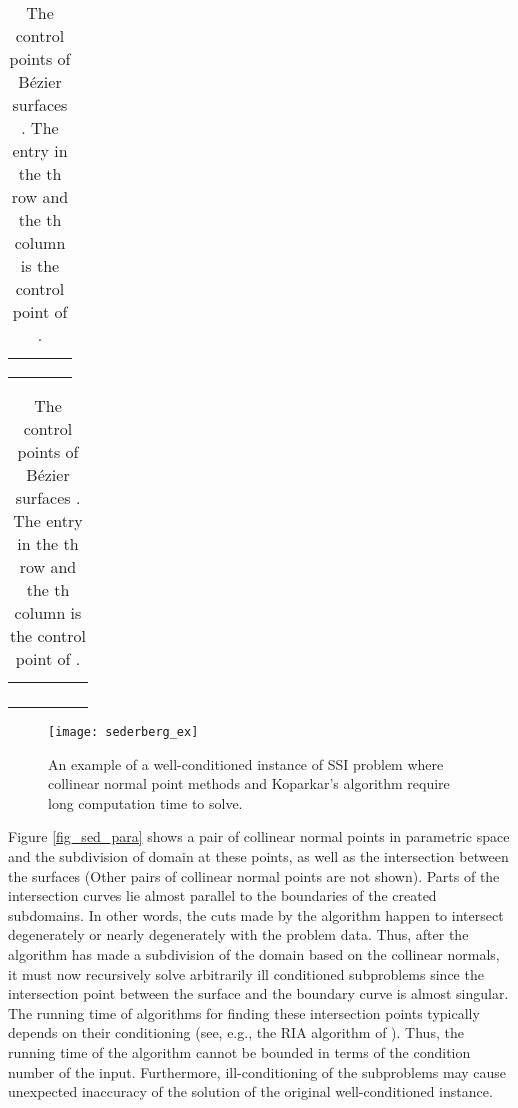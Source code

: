 \documentclass{article}
\begin{document}
\begin{table}
\begin{center}
{\scriptsize{
\begin{tabular}{|c|c|c|c|}
\hline 
 &  &&\\
\hline
&& &  \\
& && \\
& &&    \\
\hline
\end{tabular}
}}\end{center}
\caption{The control points of B\'{e}zier surfaces .  The entry in the th row and the th column is the control point  of .\label{table_sed1}}
\end{table}
\begin{table}
\begin{center}
{\scriptsize{
\begin{tabular}{|c|c|c|c|c|}
\hline 
 &  &&&\\
\hline
&&&&\\
&&&&\\
&&&&\\
&&&&\\
\hline
\end{tabular}
}}
\end{center}
\caption{The control points of B\'{e}zier surfaces .  The entry in the th row and the th column is the control point  of .\label{table_sed2}}
\end{table}

\begin{figure}
\centering
\texttt{[image: sederberg\_ex]}
\caption{An example of a well-conditioned instance of SSI 
problem where collinear normal point methods and Koparkar's algorithm 
require long computation time to solve.}
\label{fig_sed}
\end{figure}

Figure \ref{fig_sed_para} shows a pair of collinear normal points in
parametric space and the subdivision of domain at these points, as
well as the intersection between the surfaces (Other pairs of
collinear normal points are not shown).  Parts of the intersection
curves lie almost parallel to the boundaries of the created
subdomains.  In other words, the cuts made by the algorithm happen to
intersect degenerately or nearly degenerately with the problem data.
Thus, after the algorithm has made a subdivision of the domain
based on the collinear normals,
it must now recursively solve
arbitrarily ill conditioned subproblems since the
intersection point between the surface and the boundary curve is
almost singular. The running time of algorithms for finding these
intersection points typically depends on their conditioning
(see, e.g., the RIA algorithm of \cite{patrikalakis}).
Thus, the running time of the algorithm cannot be
bounded in terms of the condition number of the input.  
Furthermore, ill-conditioning of the
subproblems may cause unexpected inaccuracy of the solution of the
original well-conditioned instance.
\end{document}
